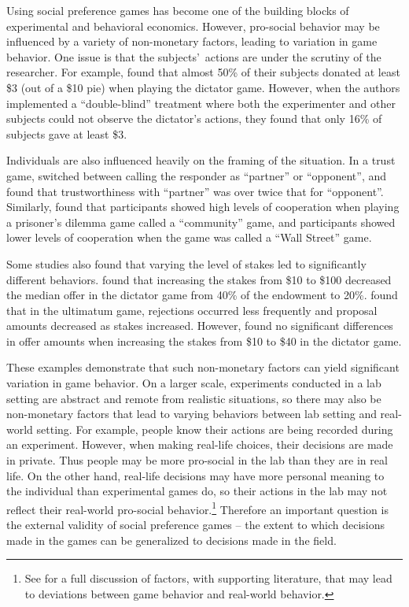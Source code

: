 \documentclass[12pt]{article}
\begin{document}
Using social preference games has become one of the building blocks of experimental and behavioral economics. However, pro-social behavior may be influenced by a variety of non-monetary factors, leading to variation in game behavior. One issue is that the subjects\rq \ actions are under the scrutiny of the researcher. For example, \cite{hoffman_1994} found that almost 50\% of their subjects donated at least \$3 (out of a \$10 pie) when playing the dictator game. However, when the authors implemented a ``double-blind'' treatment where both the experimenter and other subjects could not observe the dictator\rq s actions, they found that only 16\% of subjects gave at least \$3.

Individuals are also influenced heavily on the framing of the situation. In a trust game, \cite{burnham_mccabe_smith_2000} switched between calling the responder as ``partner'' or ``opponent'', and found that trustworthiness with ``partner'' was over twice that for ``opponent''. Similarly, \cite{ross_ward_1996} found that participants showed high levels of cooperation when playing a prisoner\rq s dilemma game called a ``community'' game, and participants showed lower levels of cooperation when the game was called a ``Wall Street'' game. 

Some studies also found that varying the level of stakes led to significantly different behaviors. \cite{carpenter_verhoogen_burks_2005} found that increasing the stakes from \$10 to \$100 decreased the median offer in the dictator game from 40\% of the endowment to 20\%. \cite{slonim_roth_1998} found that in the ultimatum game, rejections occurred less frequently and proposal amounts decreased as stakes increased. However, \cite{cherry_frykblom_shogren_2002} found no significant differences in offer amounts when increasing the stakes from \$10 to \$40 in the dictator game. 

These examples demonstrate that such non-monetary factors can yield significant variation in game behavior. On a larger scale, experiments conducted in a lab setting are abstract and remote from realistic situations, so there may also be non-monetary factors that lead to varying behaviors between lab setting and real-world setting. For example, people know their actions are being recorded during an experiment. However, when making real-life choices, their decisions are made in private. Thus people may be more pro-social in the lab than they are in real life. On the other hand, real-life decisions may have more personal meaning to the individual than experimental games do, so their actions in the lab may not reflect their real-world pro-social behavior.\footnote{See \cite{levitt_list_2007} for a full discussion of factors, with supporting literature, that may lead to deviations between game behavior and real-world behavior.} Therefore an important question is the external validity of social preference games -- the extent to which decisions made in the games can be generalized to decisions made in the field.
\end{document}
